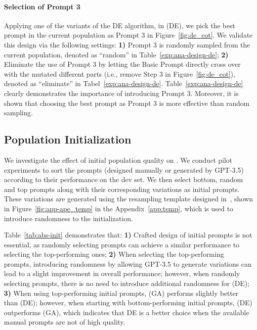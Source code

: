 \paragraph{Selection of Prompt 3}
Applying one of the variants of the DE algorithm, in \modelname (DE), we pick the best prompt in the current population as Prompt 3 in Figure~\ref{fig:de_cot}. We validate this design via the following settings: \textbf{1)} Prompt 3 is randomly sampled from the current population, denoted as ``random'' in Table~\ref{exp:ana-design-de}; \textbf{2)} Eliminate the use of Prompt 3 by letting the Basic Prompt directly cross over with the mutated different parts (i.e., remove Step 3 in Figure~\ref{fig:de_cot}), denoted as ``eliminate'' in Tabel~\ref{exp:ana-design-de}. Table~\ref{exp:ana-design-de} clearly demonstrates the importance of introducing Prompt 3. Moreover, it is shown that choosing the best prompt as Prompt 3 is more effective than random sampling.





\subsection{Population Initialization}

We investigate the effect of initial population quality on \modelname. 
We conduct pilot experiments to sort the prompts (designed manually or generated by GPT-3.5) according to their performance on the dev set. We then select bottom, random and top prompts along with their corresponding variations as initial prompts. These variations are generated using the resampling template designed in~\cite{zhou2022large}, shown in Figure~\ref{fig:app-ape_temp} in the Appendix~\ref{app:temp}, which is used to introduce randomness to the initialization. 

Table~\ref{tab:abs-init} demonstrates that: \textbf{1)} Crafted design of initial prompts is not essential, as randomly selecting prompts can achieve a similar performance to selecting the top-performing ones; 
\textbf{2)} When selecting the top-performing prompts, introducing randomness by allowing GPT-3.5 to generate variations can lead to a slight improvement in overall performance; however, when randomly selecting prompts, there is no need to introduce additional randomness for \modelname (DE); 
\textbf{3)} When using top-performing initial prompts, \modelname (GA) performs slightly better than \modelname (DE); however, when starting with bottom-performing initial prompts, \modelname (DE) outperforms \modelname (GA), which indicates that DE is a better choice when the available manual prompts are not of high quality.

 